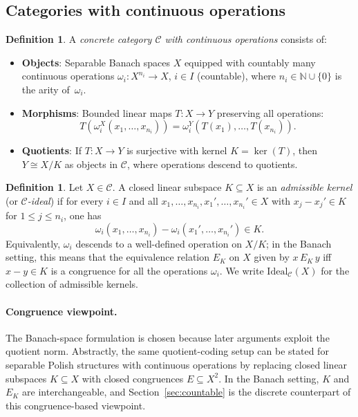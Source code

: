 \documentclass[12pt,fleqn,a4paper]{amsart}
\renewcommand{\le}{\leqslant}
\numberwithin{equation}{section}
\theoremstyle{definition}
\newtheorem{definition}[theorem]{Definition}
\newcommand{\N}{\mathbb{N}}
\newcommand{\Ideal}{\mathrm{Ideal}}
\begin{document}
\subsection{Categories with continuous operations}

\begin{definition}\label{def:category-ops}
A \emph{concrete category $\mathcal{C}$ with continuous operations} consists of:
\begin{itemize}
\item \textbf{Objects}: Separable Banach spaces $X$ equipped with countably many
continuous operations
$\omega_i: X^{n_i} \to X$, $i\in I$ (countable), where $n_i\in\N\cup\{0\}$ is the arity
of~$\omega_i$.
\item \textbf{Morphisms}: Bounded linear maps $T: X \to Y$ preserving all operations:
\[
T(\omega_i^X(x_1, \ldots, x_{n_i}))
= \omega_i^Y(T(x_1), \ldots, T(x_{n_i})).
\]
\item \textbf{Quotients}: If $T: X \to Y$ is surjective with kernel $K = \ker(T)$,
then $Y \cong X/K$ as objects in $\mathcal{C}$, where operations descend to quotients.
\end{itemize}
\end{definition}

\begin{definition}\label{def:admissible-kernel}
Let $X\in\mathcal{C}$.  A closed linear subspace $K\subseteq X$ is an
\emph{admissible kernel} (or \emph{$\mathcal{C}$-ideal}) if for every $i\in I$ and all
$x_1,\ldots,x_{n_i},x_1',\ldots,x_{n_i}'\in X$ with $x_j-x_j'\in K$ for
$1\le j\le n_i$, one has
\[
\omega_i(x_1,\dots,x_{n_i})-\omega_i(x_1',\dots,x_{n_i}')\in K.
\]
Equivalently, $\omega_i$ descends to a well-defined operation on $X/K$;
in the Banach setting, this means that the equivalence relation
$E_K$ on $X$ given by $x\,E_K\,y$ iff $x-y\in K$ is a congruence for all the
operations $\omega_i$.  We write $\Ideal_{\mathcal C}(X)$ for the collection of
admissible kernels.
\end{definition}

\paragraph{Congruence viewpoint.}
The Banach-space formulation is chosen because later arguments exploit the quotient
norm.  Abstractly, the same quotient-coding setup can be stated for separable
Polish structures with continuous operations by replacing closed linear subspaces
$K\subseteq X$ with closed congruences $E\subseteq X^2$.  In the Banach setting,
$K$ and $E_K$ are interchangeable, and Section~\ref{sec:countable} is the
discrete counterpart of this congruence-based viewpoint.
\end{document}
